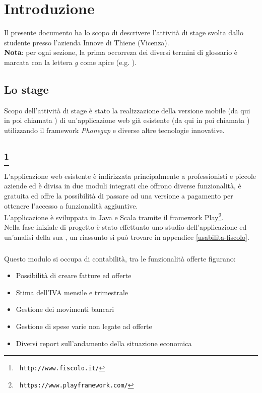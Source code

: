 \section{Introduzione}

Il presente documento ha lo scopo di descrivere l'attività di stage
svolta dallo studente presso l'azienda Innove di Thiene (Vicenza). \\

\textbf{Nota}: per ogni sezione, la prima occorreza dei diversi termini di glossario 
è marcata con la lettera \textit{g} come apice (e.g. ).

\subsection{Lo stage}
Scopo dell'attività di stage è stato la realizzazione della versione
mobile (da qui in poi chiamata \fiscoloMobile) di un'applicazione web 
già esistente (da qui in poi chiamata \fiscoloWeb) utilizzando il
framework \textit{Phonegap} e diverse altre tecnologie innovative.

\subsection[\fiscoloWeb]{\fiscoloWeb\footnote{\texttt{ http://www.fiscolo.it/}}}
L'applicazione web esistente è indirizzata principalmente a professionisti
e piccole aziende ed è divisa in due moduli integrati che offrono diverse 
funzionalità, è gratuita ed offre la possibilità di passare ad una versione
a pagamento per ottenere l'accesso a funzionalità aggiuntive. \\
L'applicazione è sviluppata in Java e Scala tramite il framework
Play\footnote{\texttt{ https://www.playframework.com/}}. \\

Nella fase iniziale di progetto è stato effettuato uno studio dell'applicazione
ed un'analisi della sua , un riassunto si può trovare in appendice
\ref{usabilita-fiscolo}.

\subsubsection{\fiscolo}
Questo modulo si occupa di contabilità, tra le funzionalità offerte figurano:

\begin{itemize}
\item Possibilità di creare fatture ed offerte
\item Stima dell'IVA mensile e trimestrale
\item Gestione dei movimenti bancari
\item Gestione di spese varie non legate ad offerte
\item Diversi report sull'andamento della situazione economica
\end{itemize}

